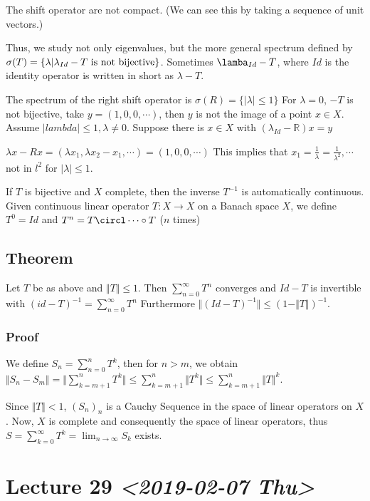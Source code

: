 \documentclass[11pt]{article}
\def\R{\mathbb{R}}
\begin{document}
The shift operator are not compact. (We can see this by taking a sequence of
unit vectors.)

Thus, we study not only eigenvalues, but the more general spectrum defined by
\(\sigma (T) = \{ \lambda \vert \lambda_{Id} - T \textup{ is not
   bijective}\}\). Sometimes \(\lamba_{Id} - T\), where \(Id\) is the identity
operator is written in short as \(\lambda - T\).

The spectrum of the right shift operator is \(\sigma(R) = \{\vert \lambda
   \vert \le 1\}\) For \(\lambda = 0\), \(-T\) is not bijective, take \(y = (1, 0, 0,
   \cdots)\), then \(y\) is not the image of a point \(x \in X\). Assume \(\vert
   lambda \vert \le 1, \lambda \neq 0\). Suppose there is \(x \in X\) with
\((\lambda_{Id} - \R)x = y\)

\(\lambda x - Rx = (\lambda x_1, \lambda x_2 - x_1, \cdots) = (1, 0, 0,
   \cdots)\) This implies that \(x_1 = \frac1\lambda = \frac{1}{\lambda^2},
   \cdots\) not in \(l^2\) for \(\vert \lambda \vert \le 1\).

If \(T\) is bijective and \(X\) complete, then the inverse \(T^{-1}\) is
automatically continuous. Given continuous linear operator \(T \colon X
   \rightarrow X\) on a Banach space \(X\), we define \(T^{0} = Id\) and \(T^n = T
   \circl \cdots \circ T\) (\(n\) times)
\subsection{Theorem}
\label{sec:orgaf1eb43}
Let \(T\) be as above and \(\Vert T \Vert \le 1\). Then \(\sum_{n=0}^{\infty} T^n\)
converges and \(Id - T\) is invertible with \((id - T)^{-1} =
   \sum_{n=0}^{\infty} T^n\) Furthermore \(\Vert (Id - T)^{-1}\Vert \le (1 - \Vert
   T \Vert)^{-1}\).
\subsubsection{Proof}
\label{sec:org95234aa}
We define \(S_n = \sum_{n = 0}^{n} T^k\), then for \(n > m\), we obtain \(\Vert
    S_n - S_m \Vert = \Vert \sum_{k = m+1}^{n} T^k\Vert \le \sum_{k = m+1}^{n}
    \Vert T^k\Vert \le \sum_{k=m+1}^{n} \Vert T \Vert^k\).

Since \(\Vert T \Vert < 1\), \((S_n)_n\) is a Cauchy Sequence in the space of
linear operators on \(X\). Now, \(X\) is complete and consequently the space of
linear operators, thus \(S = \sum_{k=0}^{\infty} T^k =\lim_{n \rightarrow
    \infty} S_k\) exists.
\section{Lecture 29 \textit{<2019-02-07 Thu>}}
\label{sec:orgcc97422}
\end{document}

